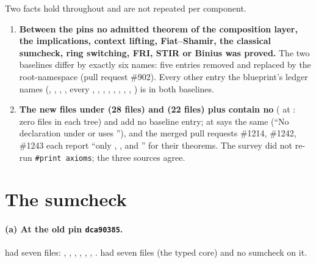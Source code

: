 Two facts hold throughout and are not repeated per component.
\begin{enumerate}[label=\textbf{Fact \arabic*.}, leftmargin=*, widest=2]
\item\label{ark-fact-baselines} \textbf{Between the pins no admitted theorem of the composition
  layer, the implications, context lifting, Fiat--Shamir, the classical sumcheck, ring
  switching, FRI, STIR or Binius was proved.} The two baselines differ by exactly six names:
  five  entries removed and
   replaced by the root-namespace
   (pull request \#902). Every other entry the
  blueprint's ledger names (,
  ,
  ,
  , every ,
  ,
  ,
  ,
  , ,
  , , ) is in both baselines.
\item\label{ark-fact-typed} \textbf{The new files under  (28 files)
  and  (22 files) plus
   contain no }
  ( at : zero files in each tree) and add no baseline
  entry;  at  says the same (``No
  declaration under  or 
  uses ''), and the merged pull requests \#1214, \#1242, \#1243 each report ``only
  , , and '' for their theorems. The survey
  did not re-run \texttt{\#print axioms}; the three sources agree.
\end{enumerate}

\section{The sumcheck}\label{sec:ark-sumcheck}

\paragraph{(a) At the old pin \texttt{dca90385}.}
 had seven files: ,
, , ,
, , .
 had seven files (the typed core) and no sumcheck on it.

